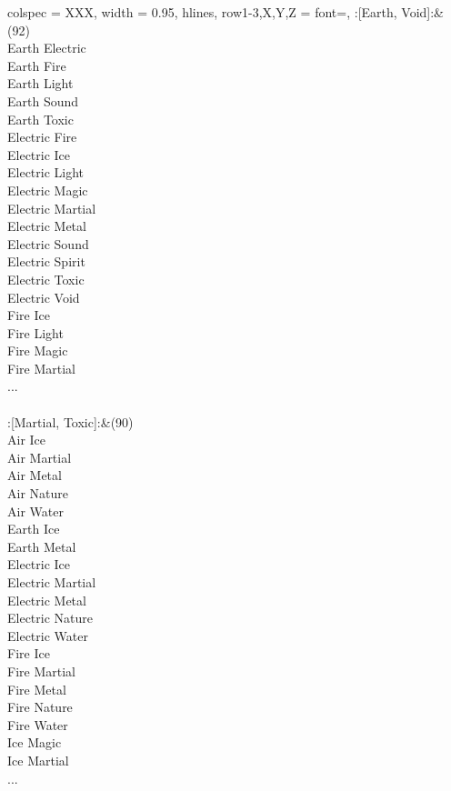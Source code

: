 \begin{longtblr}[
	caption = {2v2 Defending Weak},
	label = {2v2-Defending-Weak},
]{
	colspec = {XXX}, width = 0.95\linewidth,
	hlines,
	row{1-3,X,Y,Z} = {font=\bfseries},
}
	:[Earth, Void]:&{(92)\\
	Earth Electric \\
	Earth Fire \\
	Earth Light \\
	Earth Sound \\
	Earth Toxic \\
	Electric Fire \\
	Electric Ice \\
	Electric Light \\
	Electric Magic \\
	Electric Martial \\
	Electric Metal \\
	Electric Sound \\
	Electric Spirit \\
	Electric Toxic \\
	Electric Void \\
	Fire Ice \\
	Fire Light \\
	Fire Magic \\
	Fire Martial \\
	...\\
	}\\

	:[Martial, Toxic]:&{(90)\\
	Air Ice \\
	Air Martial \\
	Air Metal \\
	Air Nature \\
	Air Water \\
	Earth Ice \\
	Earth Metal \\
	Electric Ice \\
	Electric Martial \\
	Electric Metal \\
	Electric Nature \\
	Electric Water \\
	Fire Ice \\
	Fire Martial \\
	Fire Metal \\
	Fire Nature \\
	Fire Water \\
	Ice Magic \\
	Ice Martial \\
	...\\
	}\\


\end{longtblr}
